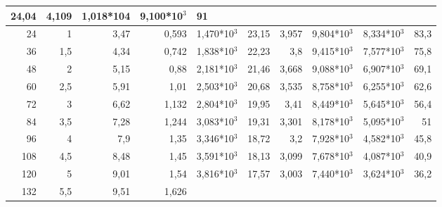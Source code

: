 \begin{table}[H]
{\begin{tabular}{|rr|rrl|rrl|l|r|}
  \multicolumn{1}{r|}{24,04} &
  \multicolumn{1}{r|}{4,109} &
  1,018*104 &
  9,100*10$^3$ &
  91 \\ \hline
\multicolumn{1}{|r|}{24} &
  1 &
  \multicolumn{1}{r|}{3,47} &
  \multicolumn{1}{r|}{0,593} &
  1,470*10$^3$ &
  \multicolumn{1}{r|}{23,15} &
  \multicolumn{1}{r|}{3,957} &
  9,804*10$^3$ &
  8,334*10$^3$ &
  83,3 \\ \hline
\multicolumn{1}{|r|}{36} &
  1,5 &
  \multicolumn{1}{r|}{4,34} &
  \multicolumn{1}{r|}{0,742} &
  1,838*10$^3$ &
  \multicolumn{1}{r|}{22,23} &
  \multicolumn{1}{r|}{3,8} &
  9,415*10$^3$ &
  7,577*10$^3$ &
  75,8 \\ \hline
\multicolumn{1}{|r|}{48} &
  2 &
  \multicolumn{1}{r|}{5,15} &
  \multicolumn{1}{r|}{0,88} &
  2,181*10$^3$ &
  \multicolumn{1}{r|}{21,46} &
  \multicolumn{1}{r|}{3,668} &
  9,088*10$^3$ &
  6,907*10$^3$ &
  69,1 \\ \hline
\multicolumn{1}{|r|}{60} &
  2,5 &
  \multicolumn{1}{r|}{5,91} &
  \multicolumn{1}{r|}{1,01} &
  2,503*10$^3$ &
  \multicolumn{1}{r|}{20,68} &
  \multicolumn{1}{r|}{3,535} &
  8,758*10$^3$ &
  6,255*10$^3$ &
  62,6 \\ \hline
\multicolumn{1}{|r|}{72} &
  3 &
  \multicolumn{1}{r|}{6,62} &
  \multicolumn{1}{r|}{1,132} &
  2,804*10$^3$ &
  \multicolumn{1}{r|}{19,95} &
  \multicolumn{1}{r|}{3,41} &
  8,449*10$^3$ &
  5,645*10$^3$ &
  56,4 \\ \hline
\multicolumn{1}{|r|}{84} &
  3,5 &
  \multicolumn{1}{r|}{7,28} &
  \multicolumn{1}{r|}{1,244} &
  3,083*10$^3$ &
  \multicolumn{1}{r|}{19,31} &
  \multicolumn{1}{r|}{3,301} &
  8,178*10$^3$ &
  5,095*10$^3$ &
  51 \\ \hline
\multicolumn{1}{|r|}{96} &
  4 &
  \multicolumn{1}{r|}{7,9} &
  \multicolumn{1}{r|}{1,35} &
  3,346*10$^3$ &
  \multicolumn{1}{r|}{18,72} &
  \multicolumn{1}{r|}{3,2} &
  7,928*10$^3$ &
  4,582*10$^3$ &
  45,8 \\ \hline
\multicolumn{1}{|r|}{108} &
  4,5 &
  \multicolumn{1}{r|}{8,48} &
  \multicolumn{1}{r|}{1,45} &
  3,591*10$^3$ &
  \multicolumn{1}{r|}{18,13} &
  \multicolumn{1}{r|}{3,099} &
  7,678*10$^3$ &
  4,087*10$^3$ &
  40,9 \\ \hline
\multicolumn{1}{|r|}{120} &
  5 &
  \multicolumn{1}{r|}{9,01} &
  \multicolumn{1}{r|}{1,54} &
  3,816*10$^3$ &
  \multicolumn{1}{r|}{17,57} &
  \multicolumn{1}{r|}{3,003} &
  7,440*10$^3$ &
  3,624*10$^3$ &
  36,2 \\ \hline
\multicolumn{1}{|r|}{132} &
  5,5 &
  \multicolumn{1}{r|}{9,51} &
  \multicolumn{1}{r|}{1,626} &

\end{tabular}}
\end{table}

